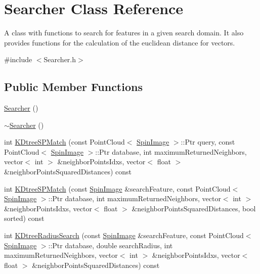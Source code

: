 \hypertarget{class_searcher}{}\section{Searcher Class Reference}
\label{class_searcher}


A class with functions to search for features in a given search domain. It also provides functions for the calculation of the euclidean distance for vectors.  




{\ttfamily \#include $<$Searcher.\+h$>$}

\subsection*{Public Member Functions}
\begin{DoxyCompactItemize}
\item 
\hyperlink{class_searcher_a46e9a9fa3aad21131cf6bd25237e3a80}{Searcher} ()
\item 
\hyperlink{class_searcher_a3e17c2eac3d13bb5eb14f7879a265ece}{$\sim$\+Searcher} ()
\item 
int \hyperlink{class_searcher_ae9ffd5f08df9cad6064818d365d0cde4}{K\+Dtree\+S\+P\+Match} (const Point\+Cloud$<$ \hyperlink{include_8h_ab79ade12a22a8e5e2864650f820e9c6f}{Spin\+Image} $>$\+::Ptr query, const Point\+Cloud$<$ \hyperlink{include_8h_ab79ade12a22a8e5e2864650f820e9c6f}{Spin\+Image} $>$\+::Ptr database, int maximum\+Returned\+Neighbors, vector$<$ int $>$ \&neighbor\+Points\+Idxs, vector$<$ float $>$ \&neighbor\+Points\+Squared\+Distances) const
\item 
int \hyperlink{class_searcher_a981bdda575da9c5c38e11bc97ab947ab}{K\+Dtree\+S\+P\+Match} (const \hyperlink{include_8h_ab79ade12a22a8e5e2864650f820e9c6f}{Spin\+Image} \&search\+Feature, const Point\+Cloud$<$ \hyperlink{include_8h_ab79ade12a22a8e5e2864650f820e9c6f}{Spin\+Image} $>$\+::Ptr database, int maximum\+Returned\+Neighbors, vector$<$ int $>$ \&neighbor\+Points\+Idxs, vector$<$ float $>$ \&neighbor\+Points\+Squared\+Distances, bool sorted) const
\item 
int \hyperlink{class_searcher_a360e9a7152dc3b9683af6375955b174a}{K\+Dtree\+Radius\+Search} (const \hyperlink{include_8h_ab79ade12a22a8e5e2864650f820e9c6f}{Spin\+Image} \&search\+Feature, const Point\+Cloud$<$ \hyperlink{include_8h_ab79ade12a22a8e5e2864650f820e9c6f}{Spin\+Image} $>$\+::Ptr database, double search\+Radius, int maximum\+Returned\+Neighbors, vector$<$ int $>$ \&neighbor\+Points\+Idxs, vector$<$ float $>$ \&neighbor\+Points\+Squared\+Distances) const

\end{DoxyCompactItemize}
